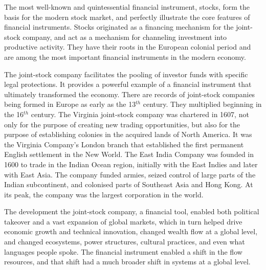 The most well-known and quintessential financial instrument, stocks, form the basis for the modern stock market, and perfectly illustrate the core features of financial instruments. %
Stocks originated as a financing mechanism for the \gls{joint-stock company}, and act as a %
mechanism for channeling investment into productive activity. They have their roots in the European colonial period and are among the most important financial instruments in the modern economy. %

The joint-stock company %
facilitates the pooling of investor funds with specific legal protections. It provides a powerful example of a financial instrument that ultimately transformed the economy. There are records of joint-stock companies being formed in Europe as early as the 13$^{th}$ century. They multiplied beginning in the 16$^{th}$ century. The Virginia joint-stock company was chartered in 1607, not only for the purpose of creating new trading opportunities, but also for the purpose of establishing colonies in the acquired lands of North America.  It was the Virginia Company's London branch that established the first permanent English settlement in the New World. The East India Company was founded in 1600 to trade in the Indian Ocean region, initially with the East Indies and later with East Asia. The company funded armies, seized control of large parts of the Indian subcontinent, and colonised parts of Southeast Asia and Hong Kong. At its peak, the company was the largest corporation in the world. 

The development the joint-stock company, a financial tool, enabled both political takeover and a vast expansion of global markets, which in turn helped drive economic growth and technical innovation, changed wealth flow at a global level, and changed ecosystems, power structures, cultural practices, and even what languages people spoke. The financial instrument enabled a shift in the flow resources, and that shift had a much broader shift in systems at a global level. %




